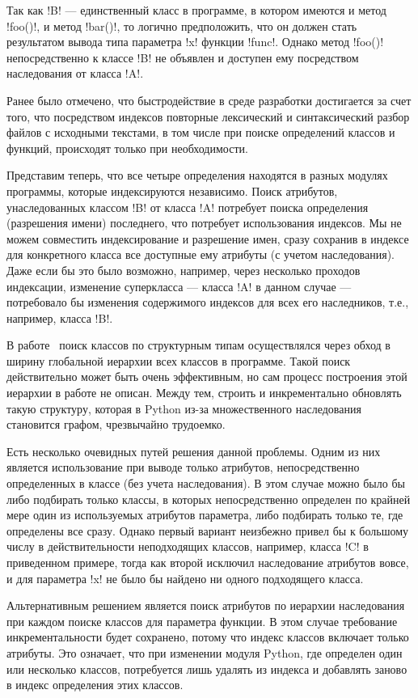 Так как !B! --- единственный класс в программе, в котором имеются и метод
!foo()!, и метод !bar()!, то логично предположить, что он должен стать
результатом вывода типа параметра !x!  функции !func!. Однако метод !foo()!
непосредственно к классе !B!  не объявлен и доступен ему посредством
наследования от класса !A!. 

Ранее было отмечено, что быстродействие в среде
разработки достигается за счет того, что посредством индексов повторные
лексический и синтаксический разбор файлов с исходными текстами, в том числе при
поиске определений классов и функций, происходят только при необходимости. 

Представим теперь, что все четыре определения находятся в разных модулях
программы, которые индексируются независимо. Поиск атрибутов, унаследованных
классом !B! от класса !A! потребует поиска определения (разрешения имени) последнего, 
что потребует использования индексов. Мы не можем совместить
индексирование и разрешение имен, сразу сохранив в индексе для конкретного
класса все доступные ему атрибуты (с учетом наследования).  Даже если бы это
было возможно, например, через несколько проходов индексации, изменение
суперкласса --- класса !A! в данном случае --- потребовало бы изменения
содержимого индексов для всех его наследников, т.е., например, класса !B!. 

В работе~\cite{Pluquet2009} поиск классов по структурным типам осуществлялся
через обход в ширину глобальной иерархии всех классов в программе. Такой поиск
действительно может быть очень эффективным, но сам процесс построения этой
иерархии в работе не описан. Между тем, строить и инкрементально обновлять такую
структуру, которая в Python из-за множественного наследования становится графом,
чрезвычайно трудоемко.

Есть несколько очевидных путей решения данной проблемы. Одним из них является
использование при выводе только атрибутов, непосредственно определенных в классе
(без учета наследования). В этом случае можно было бы либо подбирать только
классы, в которых непосредственно определен по крайней мере один из используемых
атрибутов параметра, либо подбирать только те, где определены все сразу. Однако
первый вариант неизбежно привел бы к большому числу в действительности
неподходящих классов, например, класса !C! в приведенном примере, тогда как второй
исключил наследование атрибутов вовсе, и для параметра !x! не было бы
найдено ни одного подходящего класса.

Альтернативным решением является поиск атрибутов по иерархии наследования
при каждом поиске классов для параметра функции. В этом случае требование
инкрементальности будет сохранено, потому что индекс классов включает только
атрибуты. Это означает, что при изменении модуля Python, где определен один или
несколько классов, потребуется лишь удалять из индекса и добавлять заново в
индекс определения этих классов.

